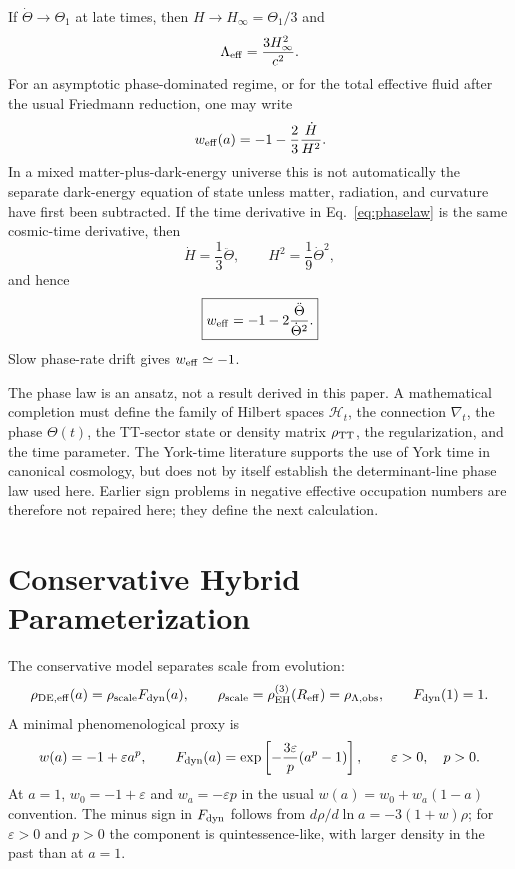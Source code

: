 \documentclass[11pt,a4paper]{article}
\newcommand{\rhoL}{\rho_{\Lambda,{\rm obs}}}
\newcommand{\Reff}{R_{\rm eff}}
\begin{document}
If $\dot{\Theta}\to\Theta_1$ at late times, then $H\to H_\infty=\Theta_1/3$ and
\begin{equation}
\Lambda_{\rm eff}=\frac{3H_\infty^2}{c^2}.
\end{equation}
For an asymptotic phase-dominated regime, or for the total effective fluid after
the usual Friedmann reduction, one may write
\begin{equation}
w_{\rm eff}(a)=-1-\frac{2}{3}\frac{\dot H}{H^2}.
\label{eq:weff_general}
\end{equation}
In a mixed matter-plus-dark-energy universe this is not automatically the
separate dark-energy equation of state unless matter, radiation, and curvature
have first been subtracted.
If the time derivative in Eq.~\eqref{eq:phaselaw} is the same cosmic-time
derivative, then
\begin{equation}
\dot H=\frac{1}{3}\ddot{\Theta},
\qquad
H^2=\frac{1}{9}\dot{\Theta}^{2},
\end{equation}
and hence
\begin{equation}
\boxed{w_{\rm eff}=-1-2\frac{\ddot{\Theta}}{\dot{\Theta}^{2}}.}
\label{eq:weff_cmc}
\end{equation}
Slow phase-rate drift gives $w_{\rm eff}\simeq-1$.

\begin{caveatbox}
The phase law is an ansatz, not a result derived in this paper.  A mathematical
completion must define the family of Hilbert spaces $\mathcal H_t$, the connection
$\nabla_t$, the phase $\Theta(t)$, the TT-sector state or density matrix
$\rho_{\rm TT}$, the regularization, and the time parameter.  The York-time
literature supports the use of York time in canonical cosmology, but does not by
itself establish the determinant-line phase law used here.  Earlier sign problems
in negative effective occupation numbers are therefore not repaired here; they
define the next calculation.
\end{caveatbox}

\section{Conservative Hybrid Parameterization}
\label{sec:hybrid}

The conservative model separates scale from evolution:
\begin{equation}
\rho_{\rm DE,eff}(a)=\rho_{\rm scale}F_{\rm dyn}(a),
\qquad
\rho_{\rm scale}=\rho_{\rm EH}^{(3)}(\Reff)=\rhoL,
\qquad
F_{\rm dyn}(1)=1.
\label{eq:hybrid}
\end{equation}
A minimal phenomenological proxy is
\begin{equation}
w(a)=-1+\varepsilon a^p,
\qquad
F_{\rm dyn}(a)=\exp\left[-\frac{3\varepsilon}{p}(a^p-1)\right],
\qquad \varepsilon>0,\quad p>0.
\label{eq:proxy}
\end{equation}
At $a=1$, $w_0=-1+\varepsilon$ and $w_a=-\varepsilon p$ in the usual
$w(a)=w_0+w_a(1-a)$ convention.  The minus sign in $F_{\rm dyn}$ follows
from $d\rho/d\ln a=-3(1+w)\rho$; for $\varepsilon>0$ and $p>0$ the component
is quintessence-like, with larger density in the past than at $a=1$.
\end{document}
